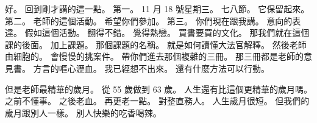\hypertarget{c01:cue:260}{}好。
\hypertarget{c01:cue:261}{}回到剛才講的這一點。
\hypertarget{c01:cue:262}{}第一。
\hypertarget{c01:cue:263}{}11 月 18 號星期三。
\hypertarget{c01:cue:264}{}七八節。
\hypertarget{c01:cue:265}{}它保留起來。
\hypertarget{c01:cue:266}{}第二。
\hypertarget{c01:cue:267}{}老師的這個活動。
\hypertarget{c01:cue:268}{}希望你們參加。
\hypertarget{c01:cue:269}{}第三。
\hypertarget{c01:cue:270}{}你們現在跟我講。
\hypertarget{c01:cue:271}{}意向的表達。
\hypertarget{c01:cue:272}{}假如這個活動。
\hypertarget{c01:cue:273}{}翻得不錯。
\hypertarget{c01:cue:274}{}覺得熱戀。
\hypertarget{c01:cue:275}{}買書要買的文化。
\hypertarget{c01:cue:276}{}那我們就在這個課的後面。
\hypertarget{c01:cue:277}{}加上課題。
\hypertarget{c01:cue:278}{}那個課題的名稱。
\hypertarget{c01:cue:279}{}就是如何讀懂大法官解釋。
\hypertarget{c01:cue:280}{}然後老師由細胞的。
\hypertarget{c01:cue:281}{}會慢慢的挑案件。
\hypertarget{c01:cue:282}{}帶你們進去那個複雜的三冊。
\hypertarget{c01:cue:283}{}那三冊都是老師的意見書。
\hypertarget{c01:cue:284}{}方言的嘔心瀝血。
\hypertarget{c01:cue:285}{}我已經想不出來。
\hypertarget{c01:cue:286}{}還有什麼方法可以行動。

\hypertarget{c01:cue:287}{}但是老師最精華的歲月。
\hypertarget{c01:cue:288}{}從 55 歲做到 63 歲。
\hypertarget{c01:cue:289}{}人生還有比這個更精華的歲月嗎。
\hypertarget{c01:cue:290}{}之前不懂事。
\hypertarget{c01:cue:291}{}之後老血。
\hypertarget{c01:cue:292}{}再更老一點。
\hypertarget{c01:cue:293}{}對整直務人。
\hypertarget{c01:cue:294}{}人生歲月很短。
\hypertarget{c01:cue:295}{}但我們的歲月跟別人一樣。
\hypertarget{c01:cue:296}{}別人快樂的吃香喝辣。


